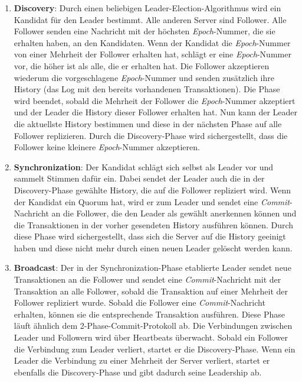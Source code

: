\begin{enumerate}
	\item \textbf{Discovery}: Durch einen beliebigen Leader-Election-Algorithmus wird ein Kandidat für den Leader bestimmt. Alle anderen Server sind Follower. Alle Follower senden eine Nachricht mit der höchsten \textit{Epoch}-Nummer, die sie erhalten haben, an den Kandidaten. Wenn der Kandidat die \textit{Epoch}-Nummer von einer Mehrheit der Follower erhalten hat, schlägt er eine \textit{Epoch}-Nummer vor, die höher ist als alle, die er erhalten hat. Die Follower akzeptieren wiederum die vorgeschlagene \textit{Epoch}-Nummer und senden zusätzlich ihre History (das Log mit den bereits vorhandenen Transaktionen).
	Die Phase wird beendet, sobald die Mehrheit der Follower die \textit{Epoch}-Nummer akzeptiert und der Leader die History dieser Follower erhalten hat. Nun kann der Leader die aktuellste History bestimmen und diese in der nächsten Phase auf alle Follower replizieren. Durch die Discovery-Phase wird sichergestellt, dass die Follower keine kleinere \textit{Epoch}-Nummer akzeptieren.
	\item \textbf{Synchronization}: Der Kandidat schlägt sich selbst als Leader vor und sammelt Stimmen dafür ein. Dabei sendet der Leader auch die in der Discovery-Phase gewählte History, die auf die Follower repliziert wird. Wenn der Kandidat ein Quorum hat, wird er zum Leader und sendet eine \textit{Commit}-Nachricht an die Follower, die den Leader als gewählt anerkennen können und die Transaktionen in der vorher gesendeten History ausführen können. Durch diese Phase wird sichergestellt, dass sich die Server auf die History geeinigt haben und diese nicht mehr durch einen neuen Leader gelöscht werden kann.
	\item \textbf{Broadcast}: Der in der Synchronization-Phase etablierte Leader sendet neue Transaktionen an die Follower und sendet eine \textit{Commit}-Nachricht mit der Transaktion an alle Follower, sobald die Transaktion auf einer Mehrheit der Follower repliziert wurde. Sobald die Follower eine \textit{Commit}-Nachricht erhalten, können sie die entsprechende Transaktion ausführen. Diese Phase läuft ähnlich dem 2-Phase-Commit-Protokoll \cite{pc} ab. Die Verbindungen zwischen Leader und Followern wird über Heartbeats überwacht. Sobald ein Follower die Verbindung zum Leader verliert, startet er die Discovery-Phase. Wenn ein Leader die Verbindung zu einer Mehrheit der Server verliert, startet er ebenfalls die Discovery-Phase und gibt dadurch seine Leadership ab.
\end{enumerate}

